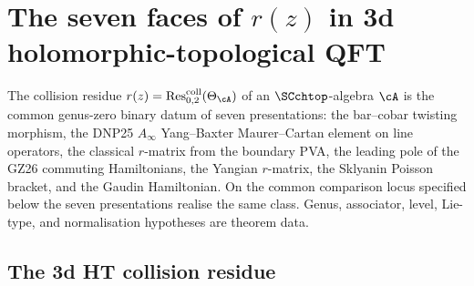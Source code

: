 
\chapter{The seven faces of $r(z)$ in 3d holomorphic-topological QFT}
\label{ch:dnp-identification-master}

The collision residue
$r(z)=\operatorname{Res}^{\mathrm{coll}}_{0,2}(\Theta_{\cA})$ of an
$\SCchtop$-algebra $\cA$ is the common genus-zero binary datum of
seven presentations: the bar--cobar twisting morphism, the DNP25
$A_\infty$ Yang--Baxter Maurer--Cartan element on line operators, the
classical $r$-matrix from the boundary PVA, the leading pole of the
GZ26 commuting Hamiltonians, the Yangian $r$-matrix, the Sklyanin
Poisson bracket, and the Gaudin Hamiltonian. On the common
comparison locus specified below the seven presentations realise the
same class. Genus, associator, level, Lie-type, and normalisation
hypotheses are theorem data.

\section{The 3d HT collision residue}
\label{sec:dnp-master-collision-residue}

